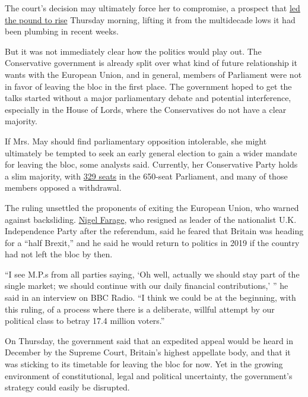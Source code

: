The court's decision may ultimately force her to compromise, a prospect
that
\href{http://www.telegraph.co.uk/business/2016/11/03/pound-smashes-123-ahead-of-brexit-high-court-verdict-and-bank-of/}{led
the pound to rise} Thursday morning, lifting it from the multidecade
lows it had been plumbing in recent weeks.

But it was not immediately clear how the politics would play out. The
Conservative government is already split over what kind of future
relationship it wants with the European Union, and in general, members
of Parliament were not in favor of leaving the bloc in the first place.
The government hoped to get the talks started without a major
parliamentary debate and potential interference, especially in the House
of Lords, where the Conservatives do not have a clear majority.

If Mrs. May should find parliamentary opposition intolerable, she might
ultimately be tempted to seek an early general election to gain a wider
mandate for leaving the bloc, some analysts said. Currently, her
Conservative Party holds a slim majority, with
\href{http://www.parliament.uk/mps-lords-and-offices/mps/current-state-of-the-parties/}{329
seats} in the 650-seat Parliament, and many of those members opposed a
withdrawal.

The ruling unsettled the proponents of exiting the European Union, who
warned against backsliding.
\href{http://www.nytimes.com/2016/07/05/world/europe/nigel-farage-ukip-brexit.html}{Nigel
Farage}, who resigned as leader of the nationalist U.K. Independence
Party after the referendum, said he feared that Britain was heading for
a ``half Brexit,'' and he said he would return to politics in 2019 if
the country had not left the bloc by then.

``I see M.P.s from all parties saying, `Oh well, actually we should stay
part of the single market; we should continue with our daily financial
contributions,' '' he said in an interview on BBC Radio. ``I think we
could be at the beginning, with this ruling, of a process where there is
a deliberate, willful attempt by our political class to betray 17.4
million voters.''

On Thursday, the government said that an expedited appeal would be heard
in December by the Supreme Court, Britain's highest appellate body, and
that it was sticking to its timetable for leaving the bloc for now. Yet
in the growing environment of constitutional, legal and political
uncertainty, the government's strategy could easily be disrupted.

